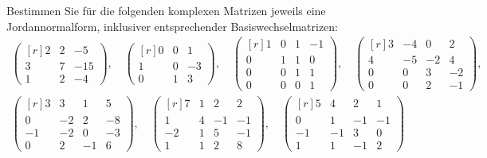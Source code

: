 \begin{question}[subtitle = Berechnung von Jordannormalformen]{1}
  Bestimmen Sie für die folgenden komplexen Matrizen jeweils eine Jordannormalform, inklusiver entsprechender Basiswechselmatrizen:
  \begin{gather*}
    \begin{pmatrix*}[r]
      2 & 2 &  -5 \\
      3 & 7 & -15 \\
      1 & 2 &  -4
    \end{pmatrix*},
    \quad
    \begin{pmatrix*}[r]
      0 & 0 &  1 \\
      1 & 0 & -3 \\
      0 & 1 &  3
    \end{pmatrix*},
    \quad
    \begin{pmatrix*}[r]
      1 & 0 & 1 & -1  \\
      0 & 1 & 1 &  0  \\
      0 & 0 & 1 &  1  \\
      0 & 0 & 0 &  1
    \end{pmatrix*},
    \quad
    \begin{pmatrix*}[r]
      3 & -4  &  0  &  2  \\
      4 & -5  & -2  &  4  \\
      0 &  0  &  3  & -2  \\
      0 &  0  &  2  & -1
    \end{pmatrix*},
  \\
    \begin{pmatrix*}[r]
       3  &  3  &  1  &  5  \\
       0  & -2  &  2  & -8  \\
      -1  & -2  &  0  & -3  \\
       0  &  2  & -1  &  6
    \end{pmatrix*},
    \quad
    \begin{pmatrix*}[r]
       7  & 1 &  2  &  2  \\
       1  & 4 & -1  & -1  \\
      -2  & 1 &  5  & -1  \\
       1  & 1 &  2  &  8
    \end{pmatrix*},
    \quad
    \begin{pmatrix*}[r]
       5  &  4  &  2  &  1  \\
       0  &  1  & -1  & -1  \\
      -1  & -1  &  3  &  0  \\
       1  &  1  & -1  &  2
    \end{pmatrix*}
  \end{gather*}
\end{question}
